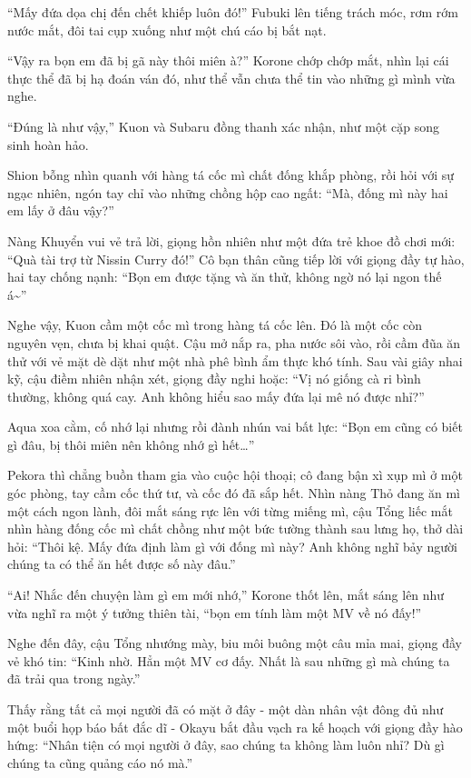 \documentclass[../main.tex]{subfiles}
\begin{document}
``Mấy đứa dọa chị đến chết khiếp luôn đó!'' Fubuki lên tiếng trách móc, rơm rớm nước mắt, đôi tai cụp xuống như một chú cáo bị bắt nạt.

``Vậy ra bọn em đã bị gã này thôi miên à?'' Korone chớp chớp mắt, nhìn lại cái thực thể đã bị hạ đoán ván đó, như thể vẫn chưa thể tin vào những gì mình vừa nghe.

``Đúng là như vậy,'' Kuon và Subaru đồng thanh xác nhận, như một cặp song sinh hoàn hảo.

Shion bỗng nhìn quanh với hàng tá cốc mì chất đống khắp phòng, rồi hỏi với sự ngạc nhiên, ngón tay chỉ vào những chồng hộp cao ngất: ``Mà, đống mì này hai em lấy ở đâu vậy?''

Nàng Khuyển vui vẻ trả lời, giọng hồn nhiên như một đứa trẻ khoe đồ chơi mới: ``Quà tài trợ từ Nissin Curry đó!'' Cô bạn thân cũng tiếp lời với giọng đầy tự hào, hai tay chống nạnh: ``Bọn em được tặng và ăn thử, không ngờ nó lại ngon thế á\~{}''

Nghe vậy, Kuon cầm một cốc mì trong hàng tá cốc lên. Đó là một cốc còn nguyên vẹn, chưa bị khai quật. Cậu mở nắp ra, pha nước sôi vào, rồi cầm đũa ăn thử với vẻ mặt dè dặt như một nhà phê bình ẩm thực khó tính. Sau vài giây nhai kỹ, cậu điềm nhiên nhận xét, giọng đầy nghi hoặc: ``Vị nó giống cà ri bình thường, không quá cay. Anh không hiểu sao mấy đứa lại mê nó được nhỉ?''

Aqua xoa cằm, cố nhớ lại nhưng rồi đành nhún vai bất lực: ``Bọn em cũng có biết gì đâu, bị thôi miên nên không nhớ gì hết\dots''

Pekora thì chẳng buồn tham gia vào cuộc hội thoại; cô đang bận xì xụp mì ở một góc phòng, tay cầm cốc thứ tư, và cốc đó đã sắp hết. Nhìn nàng Thỏ đang ăn mì một cách ngon lành, đôi mắt sáng rực lên với từng miếng mì, cậu Tổng liếc mắt nhìn hàng đống cốc mì chất chồng như một bức tường thành sau lưng họ, thở dài hỏi: ``Thôi kệ. Mấy đứa định làm gì với đống mì này? Anh không nghĩ bảy người chúng ta có thể ăn hết được số này đâu.''

``Ai! Nhắc đến chuyện làm gì em mới nhớ,'' Korone thốt lên, mắt sáng lên như vừa nghĩ ra một ý tưởng thiên tài, ``bọn em tính làm một MV về nó đấy!''

Nghe đến đây, cậu Tổng nhướng mày, biu môi buông một câu mỉa mai, giọng đầy vẻ khó tin: ``Kinh nhờ. Hẳn một MV cơ đấy. Nhất là sau những gì mà chúng ta đã trải qua trong ngày.''

Thấy rằng tất cả mọi người đã có mặt ở đây - một dàn nhân vật đông đủ như một buổi họp báo bất đắc dĩ - Okayu bắt đầu vạch ra kế hoạch với giọng đầy hào hứng: ``Nhân tiện có mọi người ở đây, sao chúng ta không làm luôn nhỉ? Dù gì chúng ta cũng quảng cáo nó mà.''
\end{document}
